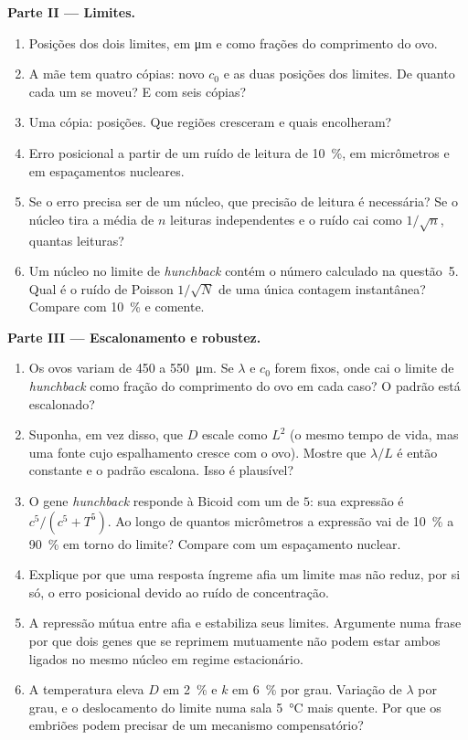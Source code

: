 \begin{problem}
\medskip
\noindent\textbf{Parte II --- Limites.}
\begin{enumerate}[resume]
  \item Posições dos dois limites, em \unit{\micro m} e como frações do
        comprimento do ovo.
  \item A mãe tem quatro cópias: novo $c_{0}$ e as duas posições dos
        limites. De quanto cada um se moveu? E com seis cópias?
  \item Uma cópia: posições. Que regiões cresceram e quais encolheram?
  \item Erro posicional a partir de um ruído de leitura de \qty{10}{\%},
        em micrômetros e em espaçamentos nucleares.
  \item Se o erro precisa ser de um núcleo, que precisão de leitura é
        necessária? Se o núcleo tira a média de $n$ leituras
        independentes e o ruído cai como $1/\sqrt{n}$, quantas leituras?
  \item Um núcleo no limite de \emph{hunchback} contém o número
        calculado na questão~5. Qual é o ruído de Poisson $1/\sqrt{N}$ de
        uma única contagem instantânea? Compare com \qty{10}{\%} e
        comente.
\end{enumerate}

\medskip
\noindent\textbf{Parte III --- Escalonamento e robustez.}
\begin{enumerate}[resume]
  \item Os ovos variam de \qty{450}{} a \qty{550}{\micro m}. Se $\lambda$
        e $c_{0}$ forem fixos, onde cai o limite de \emph{hunchback} como
        fração do comprimento do ovo em cada caso? O padrão está
        escalonado?
  \item Suponha, em vez disso, que $D$ escale como $L^{2}$ (o mesmo tempo
        de vida, mas uma fonte cujo espalhamento cresce com o ovo).
        Mostre que $\lambda/L$ é então constante e o padrão escalona.
        Isso é plausível?
  \item O gene \emph{hunchback} responde à Bicoid com um  de $5$: sua expressão é $c^{5}/(c^{5} + T^{5})$. Ao longo de
        quantos micrômetros a expressão vai de \qty{10}{\%} a
        \qty{90}{\%} em torno do limite? Compare com um espaçamento
        nuclear.
  \item Explique por que uma resposta íngreme afia um limite mas não
        reduz, por si só, o erro posicional devido ao ruído de
        concentração.
  \item A repressão mútua entre  afia e estabiliza seus limites.
        Argumente numa frase por que dois genes que se reprimem
        mutuamente não podem estar ambos ligados no mesmo núcleo em
        regime estacionário.
  \item A temperatura eleva $D$ em \qty{2}{\%} e $k$ em \qty{6}{\%} por
        grau. Variação de $\lambda$ por grau, e o deslocamento do limite
        numa sala \qty{5}{\celsius} mais quente. Por que os embriões
        podem precisar de um mecanismo compensatório?
\end{enumerate}


\end{problem}
